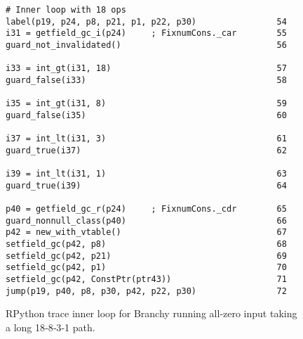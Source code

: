 \begin{figure}[!htbp]
  \centering
  \begin{minipage}{0.5\textwidth}
    \begin{lstlisting}[style=rptrace-style]
# Inner loop with 18 ops
label(p19, p24, p8, p21, p1, p22, p30)                54
i31 = getfield_gc_i(p24)     ; FixnumCons._car        55
guard_not_invalidated()                               56

i33 = int_gt(i31, 18)                                 57
guard_false(i33)                                      58

i35 = int_gt(i31, 8)                                  59
guard_false(i35)                                      60

i37 = int_lt(i31, 3)                                  61
guard_true(i37)                                       62

i39 = int_lt(i31, 1)                                  63
guard_true(i39)                                       64

p40 = getfield_gc_r(p24)     ; FixnumCons._cdr        65
guard_nonnull_class(p40)                              66
p42 = new_with_vtable()                               67
setfield_gc(p42, p8)                                  68
setfield_gc(p42, p21)                                 69
setfield_gc(p42, p1)                                  70
setfield_gc(p42, ConstPtr(ptr43))                     71
jump(p19, p40, p8, p30, p42, p22, p30)                72\end{lstlisting}
  \end{minipage}
  \caption{RPython trace inner loop for Branchy running all‑zero input taking a long 18‑8‑3‑1 path.}
  \label{fig:branchy-long-path-trace}
\end{figure}
